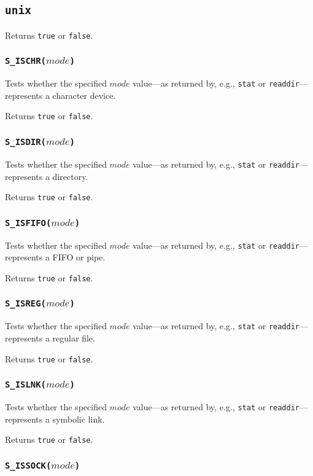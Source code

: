 \documentclass[11pt, oneside]{memoir}
\newcommand*{\true}[0]{\texttt{true}\xspace}
\newcommand*{\false}[0]{\texttt{false}\xspace}
\newcommand*{\syscall}[1]{\texttt{#1}\xspace}
\newcommand*{\fn}[1]{\texttt{#1}\xspace}
\newcounter{toccols}
\newenvironment{Module}[1]{
	\subsection{\texttt{#1}}
	\addtocontents{toc}{
		\protect\begin{multicols}{\value{toccols}}
	}
}{
	\addtocontents{toc}{\protect\end{multicols}}
}
\begin{document}
\begin{Module}{unix}
Returns \true or \false.

\subsubsection[\fn{S\_ISCHR}]{\fn{S\_ISCHR($mode$)}}

Tests whether the specified $mode$ value---as returned by, e.g., \syscall{stat} or \syscall{readdir}---represents a character device.

Returns \true or \false.

\subsubsection[\fn{S\_ISDIR}]{\fn{S\_ISDIR($mode$)}}

Tests whether the specified $mode$ value---as returned by, e.g., \syscall{stat} or \syscall{readdir}---represents a directory.

Returns \true or \false.

\subsubsection[\fn{S\_ISFIFO}]{\fn{S\_ISFIFO($mode$)}}

Tests whether the specified $mode$ value---as returned by, e.g., \syscall{stat} or \syscall{readdir}---represents a FIFO or pipe.

Returns \true or \false.

\subsubsection[\fn{S\_ISREG}]{\fn{S\_ISREG($mode$)}}

Tests whether the specified $mode$ value---as returned by, e.g., \syscall{stat} or \syscall{readdir}---represents a regular file.

Returns \true or \false.

\subsubsection[\fn{S\_ISLNK}]{\fn{S\_ISLNK($mode$)}}

Tests whether the specified $mode$ value---as returned by, e.g., \syscall{stat} or \syscall{readdir}---represents a symbolic link.

Returns \true or \false.

\subsubsection[\fn{S\_ISSOCK}]{\fn{S\_ISSOCK($mode$)}}


\end{Module}
\end{document}
